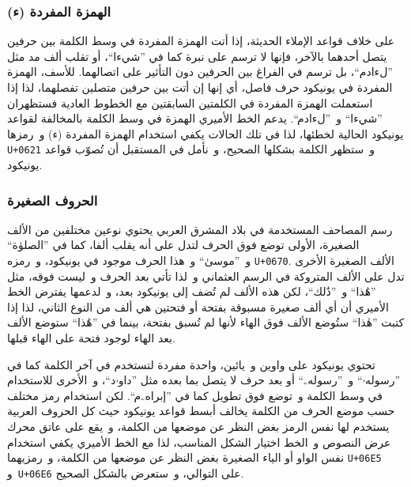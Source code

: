 \documentclass[a4paper]{article}
\renewcommand\U[1]{\colorbox{codecolor}{\texttt{U+#1}}}
\begin{document}
\subsubsection{الهمزة المفردة (\textup{\arabicfont ء})}
على خلاف قواعد الإملاء الحديثة، إذا أتت الهمزة المفردة في وسط الكلمة بين
حرفين يتصل أحدهما بالآخر، فإنها لا ترسم على نبرة كما في ”شيءا“، أو تقلب
ألف مد مثل ”لءادم“، بل ترسم في الفراغ بين الحرفين دون التأثير على
اتصالهما. للأسف، الهمزة المفردة في يونيكود حرف فاصل، أي إنها إن أتت بين
حرفين متصلين تفصلهما، لذا إذا استعملت الهمزة المفردة في الكلمتين
السابقتين مع الخطوط العادية فستظهران ”شي‌ء‌ا“
و ”ل‌ء‌ادم“. يدعم الخط الأميري الهمزة في وسط الكلمة بالمخالفة
لقواعد يونيكود الحالية لخطئها، لذا في تلك الحالات يكفي استخدام الهمزة
المفردة (ء) و رمزها \U{0621} و ستظهر الكلمة بشكلها الصحيح، و نأمل
في المستقبل أن تُصوّب قواعد يونيكود.

\subsubsection{الحروف الصغيرة}
\begin{description}[style=nextline]
\item[الألف الصغيرة (◌ٰ)]
	رسم المصاحف المستخدمة في بلاد المشرق العربي يحتوي نوعين مختلفين من
	الألف الصغيرة، الأولى توضع فوق الحرف لتدل على أنه يقلب ألفا، كما في
	”الصلوٰة“ و ”موسىٰ“ و هذا الحرف موجود في يونيكود، و رمزه
	\U{0670}. الألف الصغيرة الأخرى تدل على الألف المتروكة في
	الرسم العثماني و لذا تأتي بعد الحرف و ليست فوقه، مثل ”هَٰذا“ و ”ذَٰلك“،
	لكن هذه الألف لم تُضف إلى يونيكود بعد، و لدعمها يفترض الخط الأميري أن
	أي ألف صغيرة مسبوقة بفتحة أو فتحتين هي ألف من النوع الثاني، لذا إذا
	كتبت ”هٰذا“ ستُوضع الألف فوق الهاء لأنها لم تُسبق بفتحة، بينما في ”هَٰذا“
	ستوضع الألف بعد الهاء لوجود فتحة على الهاء قبلها.

\item[الواو (ۥ) و الياء (ۦ) الصغيرتين]
	تحتوي يونيكود على واوين و يائين، واحدة مفردة لتستخدم في آخر الكلمة
	كما في ”رسولهۥ“ و ”رسولهۦ“ أو بعد حرف لا يتصل بما بعده مثل ”داوۥد“،
	و الأخرى للاستخدام في وسط الكلمة و توضع فوق تطويل كما في ”إبراهۦم“.
	لكن استخدام رمز مختلف حسب موضع الحرف من الكلمة يخالف أبسط قواعد
	يونيكود حيث كل الحروف العربية يستخدم لها نفس الرمز بغض النظر عن
	موضعها من الكلمة، و يقع على عاتق محرك عرض النصوص و الخط اختيار الشكل
	المناسب، لذا مع الخط الأميري يكفي استخدام نفس الواو أو الياء الصغيرة
	بغض النظر عن موضعها من الكلمة، و رمزيهما \U{06E5}
	و \U{06E6} على التوالي، و ستعرض بالشكل الصحيح.
\end{description}
\end{document}
